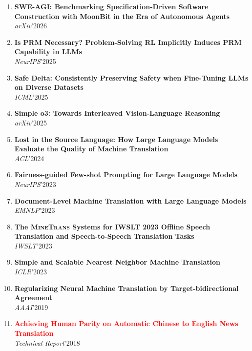 \documentclass{resume}
\begin{document}
\begin{enumerate}

\item \normalsize \textbf{SWE-AGI: Benchmarking Specification-Driven Software Construction with MoonBit in the Era of Autonomous Agents}\\
\small \textit{arXiv}'2026

\item \normalsize \textbf{Is PRM Necessary? Problem-Solving RL Implicitly Induces PRM Capability in LLMs}\\
\small \textit{NeurIPS}'2025

\item \normalsize \textbf{Safe Delta: Consistently Preserving Safety when Fine-Tuning LLMs on Diverse Datasets}\\
\small \textit{ICML}'2025

\item \normalsize \textbf{Simple o3: Towards Interleaved Vision-Language Reasoning}\\
\small \textit{arXiv}'2025

\item \normalsize \textbf{Lost in the Source Language: How Large Language Models Evaluate the Quality of Machine Translation}\\
\small \textit{ACL}'2024

\item \normalsize \textbf{Fairness-guided Few-shot Prompting for Large Language Models}\\ 
\small \textit{NeurIPS}'2023

\item \normalsize \textbf{Document-Level Machine Translation with Large Language Models}\\ 
\small \textit{EMNLP}'2023

\item \normalsize \textbf{The \textsc{MineTrans} Systems for IWSLT 2023 Offline Speech Translation and Speech-to-Speech Translation Tasks}\\ 
\small \textit{IWSLT}'2023

\item \normalsize \textbf{Simple and Scalable Nearest Neighbor Machine Translation}\\
\small \textit{ICLR}'2023

\item \normalsize \textbf{Regularizing Neural Machine Translation by Target-bidirectional Agreement} \\
\small \textit{AAAI}'2019

\item \normalsize \textcolor{red}{\textbf{Achieving Human Parity on Automatic Chinese to English News Translation}} \\
\small \textit{Technical Report}'2018

\end{enumerate}
\end{document}
